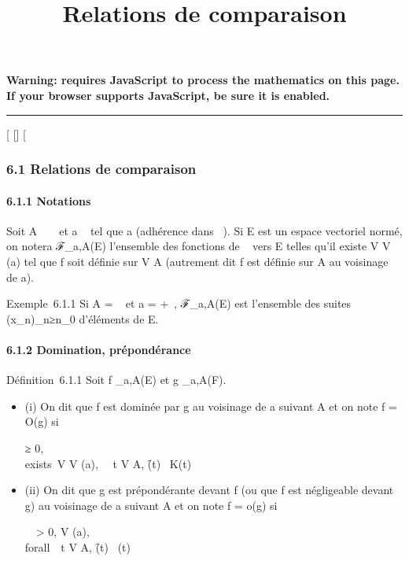 \documentclass[]{article}
\title{Relations de comparaison}
\author{}
\date{}
\begin{document}
\maketitle

\textbf{Warning: 
requires JavaScript to process the mathematics on this page.\\ If your
browser supports JavaScript, be sure it is enabled.}

\begin{center}\rule{3in}{0.4pt}\end{center}

{[}
{[}{]}
{[}

\subsubsection{6.1 Relations de comparaison}

\paragraph{6.1.1 Notations}

Soit A \subset~ ~ et a \in\overline{}~ tel que a
\in\overlineA (adhérence dans
\overline{}~). Si E est un espace vectoriel normé, on
notera ℱ_a,A(E) l'ensemble des fonctions de ~ vers E telles
qu'il existe V \in V (a) tel que f soit définie sur V \bigcap A (autrement dit f
est définie sur A au voisinage de a).

Exemple~6.1.1 Si A = ~ et a = +\infty~, ℱ_a,A(E) est l'ensemble des
suites (x_n)_n≥n_0 d'éléments de E.

\paragraph{6.1.2 Domination, prépondérance}

Définition~6.1.1 Soit f _a,A(E) et g _a,A(F).

\begin{itemize}
\item
  (i) On dit que f est dominée par g au voisinage de a suivant A et on
  note f = O(g) si

  \existsK ≥ 0, \\exists~V \in V
  (a), \forall~~t \in V \bigcap A,
  \f(t)\ \leq
  K\g(t)\
\item
  (ii) On dit que g est prépondérante devant f (ou que f est négligeable
  devant g) au voisinage de a suivant A et on note f = o(g) si

  \forall~~\epsilon \textgreater{} 0,
  \existsV \in V (a), \\forall~~t \in V
  \bigcap A, \f(t)\ \leq
  \epsilon\g(t)\
\end{itemize}
\end{document}

